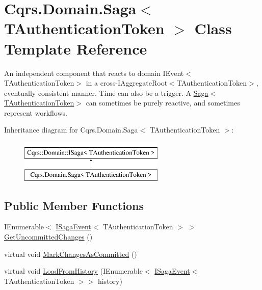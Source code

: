 \hypertarget{classCqrs_1_1Domain_1_1Saga}{}\section{Cqrs.\+Domain.\+Saga$<$ T\+Authentication\+Token $>$ Class Template Reference}
\label{classCqrs_1_1Domain_1_1Saga}


An independent component that reacts to domain I\+Event$<$\+T\+Authentication\+Token$>$ in a cross-\/I\+Aggregate\+Root$<$\+T\+Authentication\+Token$>$, eventually consistent manner. Time can also be a trigger. A \hyperlink{classCqrs_1_1Domain_1_1Saga_a1b6019cecbbf2572b64dd456cb5d91a2_a1b6019cecbbf2572b64dd456cb5d91a2}{Saga$<$\+T\+Authentication\+Token$>$} can sometimes be purely reactive, and sometimes represent workflows.  


Inheritance diagram for Cqrs.\+Domain.\+Saga$<$ T\+Authentication\+Token $>$\+:\begin{figure}[H]
\begin{center}
\leavevmode
\includegraphics[height=2.000000cm]{classCqrs_1_1Domain_1_1Saga}
\end{center}
\end{figure}
\subsection*{Public Member Functions}
\begin{DoxyCompactItemize}
\item 
I\+Enumerable$<$ \hyperlink{interfaceCqrs_1_1Events_1_1ISagaEvent}{I\+Saga\+Event}$<$ T\+Authentication\+Token $>$ $>$ \hyperlink{classCqrs_1_1Domain_1_1Saga_a043e8e21e7550c34f5848af7a87e33cd_a043e8e21e7550c34f5848af7a87e33cd}{Get\+Uncommitted\+Changes} ()
\item 
virtual void \hyperlink{classCqrs_1_1Domain_1_1Saga_a9caac842ea6e88d6e502b63ca1820fe4_a9caac842ea6e88d6e502b63ca1820fe4}{Mark\+Changes\+As\+Committed} ()
\item 
virtual void \hyperlink{classCqrs_1_1Domain_1_1Saga_a6029fc09445e2093f7fb40e304a04ff8_a6029fc09445e2093f7fb40e304a04ff8}{Load\+From\+History} (I\+Enumerable$<$ \hyperlink{interfaceCqrs_1_1Events_1_1ISagaEvent}{I\+Saga\+Event}$<$ T\+Authentication\+Token $>$$>$ history)
\end{DoxyCompactItemize}
